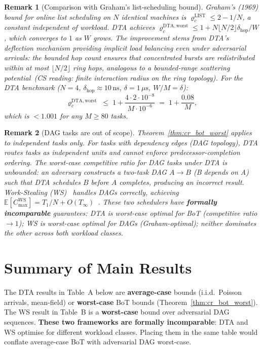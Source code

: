 \documentclass[11pt,a4paper]{article}
\newtheorem{remark}{Remark}[section]
\newcommand{\physics}[2]{#1\ \textnormal{(\emph{CS reading}: #2)}}
\begin{document}
\begin{remark}[Comparison with Graham's list-scheduling bound]
Graham's (1969) bound for online list scheduling on $N$ identical machines
is $\varrho_c^{\mathrm{LIST}} \le 2 - 1/N$, a constant independent of workload.
DTA achieves $\varrho_c^{\mathrm{DTA,worst}} \le 1 + N\lfloor N/2\rfloor\delta_{\mathrm{hop}}/W$,
which converges to $1$ as $W$ grows.
The improvement stems from DTA's deflection mechanism providing implicit
load balancing even under adversarial arrivals:
the bounded hop count ensures that concentrated bursts are redistributed
within at most $\lfloor N/2 \rfloor$ ring hops, analogous to a
\physics{bounded-range scattering potential}{finite interaction radius on the
ring topology}.
For the DTA benchmark ($N=4$, $\delta_{\mathrm{hop}} \approx 10\,\mathrm{ns}$,
$\delta = 1\,\mu\mathrm{s}$, $W/M = \delta$):
\[
  \varrho_c^{\mathrm{DTA,worst}} \;\le\; 1 + \frac{4 \cdot 2 \cdot 10^{-8}}{M \cdot 10^{-6}}
  \;=\; 1 + \frac{0.08}{M},
\]
which is $< 1.001$ for any $M \ge 80$ tasks.
\end{remark}

\begin{remark}[DAG tasks are out of scope]
Theorem~\ref{thm:cr_bot_worst} applies to \emph{independent} tasks only.
For tasks with dependency edges (DAG topology), DTA routes tasks as
independent units and cannot enforce predecessor-completion ordering.
The worst-case competitive ratio for DAG tasks under DTA is
\emph{unbounded}: an adversary constructs a two-task DAG
$A \to B$ (B depends on A) such that DTA schedules $B$ before $A$ completes,
producing an incorrect result.
Work-Stealing (WS)~\cite{blumofe1999,acar2002} handles DAGs correctly,
achieving $\mathbb{E}[C_{\max}^{\mathrm{WS}}] = T_1/N + O(T_\infty)$~\cite{arora2001}.
These two schedulers have \textbf{formally incomparable} guarantees:
DTA is worst-case optimal for BoT (competitive ratio $\to 1$);
WS is worst-case optimal for DAGs (Graham-optimal);
neither dominates the other across both workload classes.
\end{remark}

\section*{Summary of Main Results}

\begin{tcolorbox}[colback=yellow!5!white,colframe=orange!60!black,title=Scope Warning]
The DTA results in Table~A below are \textbf{average-case} bounds (i.i.d.\ Poisson
arrivals, mean-field) or \textbf{worst-case} BoT bounds (Theorem~\ref{thm:cr_bot_worst}).
The WS result in Table~B is a \textbf{worst-case} bound over adversarial DAG sequences.
\textbf{These two frameworks are formally incomparable}: DTA and WS optimise
for different workload classes.  Placing them in the same table would conflate
average-case BoT with adversarial DAG worst-case.
\end{tcolorbox}
\end{document}

